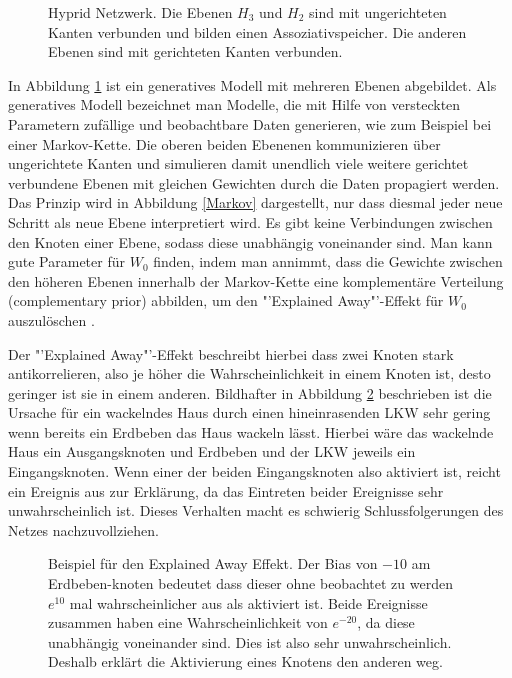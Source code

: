 \documentclass[12pt]{article}
\begin{document}
\begin{figure}[H]
	\center
	
	\caption{Hyprid Netzwerk. Die Ebenen $H_3$ und $H_2$ sind mit ungerichteten Kanten verbunden und bilden einen Assoziativspeicher. Die anderen Ebenen sind mit gerichteten Kanten verbunden.}
	\label{Netz}
\end{figure}

In Abbildung \ref{Netz} ist ein generatives Modell mit mehreren Ebenen abgebildet. Als generatives Modell bezeichnet man Modelle, die mit Hilfe von versteckten Parametern zufällige und  beobachtbare Daten generieren, wie zum Beispiel bei einer Markov-Kette. Die oberen beiden Ebenenen kommunizieren über ungerichtete Kanten und simulieren damit unendlich viele weitere gerichtet verbundene Ebenen mit gleichen Gewichten durch die Daten propagiert werden. Das Prinzip wird in Abbildung \ref{Markov} dargestellt, nur dass diesmal jeder neue Schritt als neue Ebene interpretiert wird.  Es gibt keine Verbindungen zwischen den Knoten einer Ebene, sodass diese unabhängig voneinander sind.  Man kann gute Parameter für $W_0$ finden, indem man annimmt, dass die  Gewichte zwischen den höheren Ebenen innerhalb der Markov-Kette eine komplementäre Verteilung (complementary prior) abbilden, um den "'Explained Away"'-Effekt für $W_0$ auszulöschen \cite{learning}.

Der "'Explained Away"'-Effekt beschreibt hierbei dass zwei Knoten stark antikorrelieren, also je höher die Wahrscheinlichkeit in einem Knoten ist, desto geringer ist sie in einem anderen. 
Bildhafter in Abbildung \ref{ExplainedAway} beschrieben ist die Ursache für ein wackelndes Haus durch einen hineinrasenden LKW sehr gering wenn bereits ein Erdbeben das Haus wackeln lässt. Hierbei wäre das wackelnde Haus ein Ausgangsknoten und Erdbeben und der LKW jeweils ein Eingangsknoten. Wenn einer der beiden Eingangsknoten also aktiviert ist, reicht ein Ereignis aus zur Erklärung, da das Eintreten beider Ereignisse sehr unwahrscheinlich ist. Dieses Verhalten macht es schwierig Schlussfolgerungen des Netzes nachzuvollziehen. 

\begin{figure}[H]
	\center
	
	\caption{Beispiel für den Explained Away Effekt. Der Bias von $-10$ am Erdbeben-knoten bedeutet dass dieser ohne beobachtet zu werden $e^{10}$ mal wahrscheinlicher aus als aktiviert ist. Beide Ereignisse zusammen haben eine Wahrscheinlichkeit von $e^{-20}$, da diese unabhängig voneinander sind. Dies ist also sehr unwahrscheinlich. Deshalb erklärt die Aktivierung eines Knotens den anderen weg.}
	\label{ExplainedAway}
\end{figure}
\end{document}
